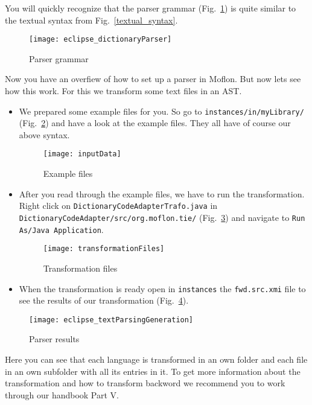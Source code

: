 You will quickly recognize that the parser grammar (Fig.~\ref{ParserGrammar}) is quite similar to the textual syntax from Fig.~\ref{textual_syntax}.

\begin{figure}[htbp]
	\centering
	\texttt{[image: eclipse\_dictionaryParser]}
	\caption{Parser grammar} 
	\label{ParserGrammar} 
\end{figure}

Now you have an overfiew of how to set up a parser in Moflon. But now lets see how this work. For this we transform some text files in an AST.

\begin{itemize}
\item We prepared some example files for you. So go to \texttt{instances/\-in/\-my\-Library/} (Fig.~\ref{ExampeFiles}) and have a look at the example files. They all have of course our above syntax.

\begin{figure}[htbp]
	\centering
	\texttt{[image: inputData]}
	\caption{Example files} 
	\label{ExampeFiles} 
\end{figure}

\item After you read through the example files, we have to run the transformation. Right click on \texttt{DictionaryCodeAdapterTrafo.java} in \texttt{Dic\-tionaryCodeAdapter/src/org.moflon.tie/} (Fig.~\ref{trafoExecution}) and navigate to \texttt{Run As/Java Application}. 

\begin{figure}[htbp]
	\centering
	\texttt{[image: transformationFiles]}
	\caption{Transformation files} 
	\label{trafoExecution} 
\end{figure}

\item When the transformation is ready open in \texttt{instances} the \texttt{fwd.src.xmi} file to see the results of our transformation (Fig.~\ref{parserResults}).
\end{itemize}

\begin{figure}[htb]
	\centering
	\texttt{[image: eclipse\_textParsingGeneration]}
	\caption{Parser results} 
	\label{parserResults} 
\end{figure}

Here you can see that each language is transformed in an own folder and each file in an own subfolder with all its entries in it.
\newline
To get more information about the transformation and how to transform backword we recommend you to work through our handbook Part V.